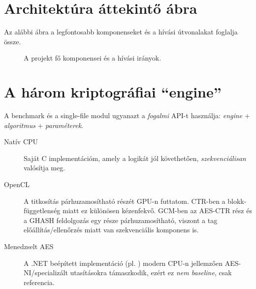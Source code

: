\section{Architektúra áttekintő ábra}

Az alábbi ábra a legfontosabb komponenseket és a hívási útvonalakat foglalja össze.

\begin{figure}[h!]
  \centering
  \caption{A projekt fő komponensei és a hívási irányok.}
\end{figure}

\section{A három kriptográfiai ``engine''}

A benchmark és a single-file modul ugyanazt a \emph{fogalmi} API-t használja: \emph{engine} + \emph{algoritmus} + \emph{paraméterek}.

\begin{description}
  \item[Natív CPU] Saját C implementációm, amely a logikát jól követhetően, \emph{szekvenciálisan} valósítja meg.
  \item[OpenCL] A titkosítás párhuzamosítható részét GPU-n futtatom. CTR-ben a blokk-függetlenség miatt ez különösen kézenfekvő.
        GCM-ben az AES-CTR rész és a GHASH feldolgozás egy része párhuzamosítható, viszont a tag előállítás/ellenőrzés miatt van szekvenciális komponens is.
  \item[Menedzselt AES] A .NET beépített implementáció (pl. ) modern CPU-n jellemzően AES-NI/specializált utasításokra támaszkodik,
        ezért ez \emph{nem baseline}, csak referencia.
\end{description}

